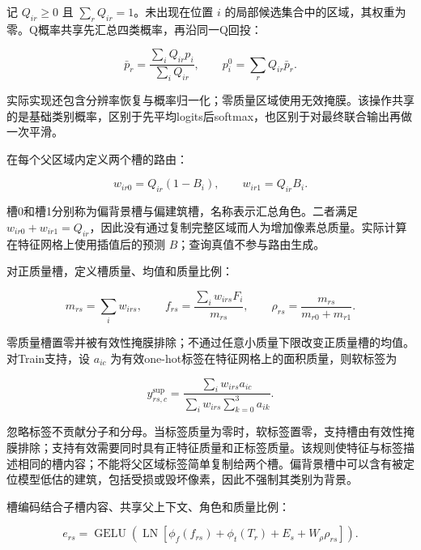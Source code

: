 \documentclass[UTF8,a4paper,zihao=-4,fontset=none]{ctexart}
\begin{document}
记 \(Q_{ir} \geq 0\) 且 \(\sum_{r}Q_{ir} = 1\)。未出现在位置 \(i\) 的局部候选集合中的区域，其权重为零。Q概率共享先汇总四类概率，再沿同一Q回投：

\begin{equation}
\label{eq:1}
\bar p_r=\frac{\sum_i Q_{ir}p_i}{\sum_i Q_{ir}},
\qquad p_i^0=\sum_r Q_{ir}\bar p_r.
\end{equation}

实际实现还包含分辨率恢复与概率归一化；零质量区域使用无效掩膜。该操作共享的是基础类别概率，区别于先平均logits后softmax，也区别于对最终联合输出再做一次平滑。

在每个父区域内定义两个槽的路由：

\begin{equation}
\label{eq:2}
w_{ir0}=Q_{ir}(1-B_i),\qquad w_{ir1}=Q_{ir}B_i.
\end{equation}

槽0和槽1分别称为偏背景槽与偏建筑槽，名称表示汇总角色。二者满足 \(w_{ir0} + w_{ir1} = Q_{ir}\)，因此没有通过复制完整区域而人为增加像素总质量。实际计算在特征网格上使用插值后的预测 \(B\)；查询真值不参与路由生成。

对正质量槽，定义槽质量、均值和质量比例：

\begin{equation}
\label{eq:3}
m_{rs}=\sum_i w_{irs},\qquad
f_{rs}=\frac{\sum_i w_{irs}F_i}{m_{rs}},\qquad
\rho_{rs}=\frac{m_{rs}}{m_{r0}+m_{r1}}.
\end{equation}

零质量槽置零并被有效性掩膜排除；不通过任意小质量下限改变正质量槽的均值。对Train支持，设 \(a_{ic}\) 为有效one-hot标签在特征网格上的面积质量，则软标签为

\begin{equation}
\label{eq:4}
y_{rs,c}^{\mathrm{sup}}=
\frac{\sum_i w_{irs}a_{ic}}{\sum_i w_{irs}\sum_{k=0}^{3}a_{ik}}.
\end{equation}

忽略标签不贡献分子和分母。当标签质量为零时，软标签置零，支持槽由有效性掩膜排除；支持有效需要同时具有正特征质量和正标签质量。该规则使特征与标签描述相同的槽内容；不能将父区域标签简单复制给两个槽。偏背景槽中可以含有被定位模型低估的建筑，包括受损或毁坏像素，因此不强制其类别为背景。

槽编码结合子槽内容、共享父上下文、角色和质量比例：

\begin{equation}
\label{eq:5}
e_{rs}=\operatorname{GELU}\!\left(
\operatorname{LN}\!\left[\phi_f(f_{rs})+\phi_t(T_r)+E_s+W_\rho\rho_{rs}\right]\right).
\end{equation}
\end{document}
